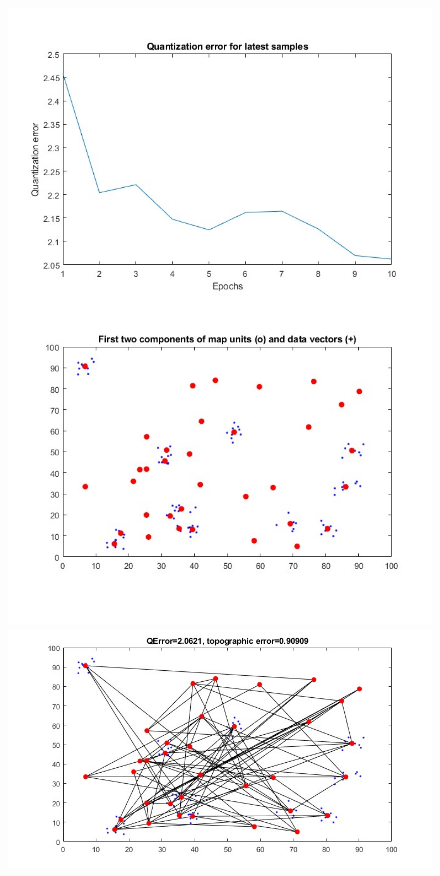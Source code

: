\documentclass[11pt]{article}
\begin{document}
\begin{figure}[h]
  \includegraphics{screeny/WTA/WTA_10_object/WTA_learning_process.jpg}
  \includegraphics{screeny/WTA/WTA_10_object/WTA_Graph.jpg}

\end{figure}
\end{document}
